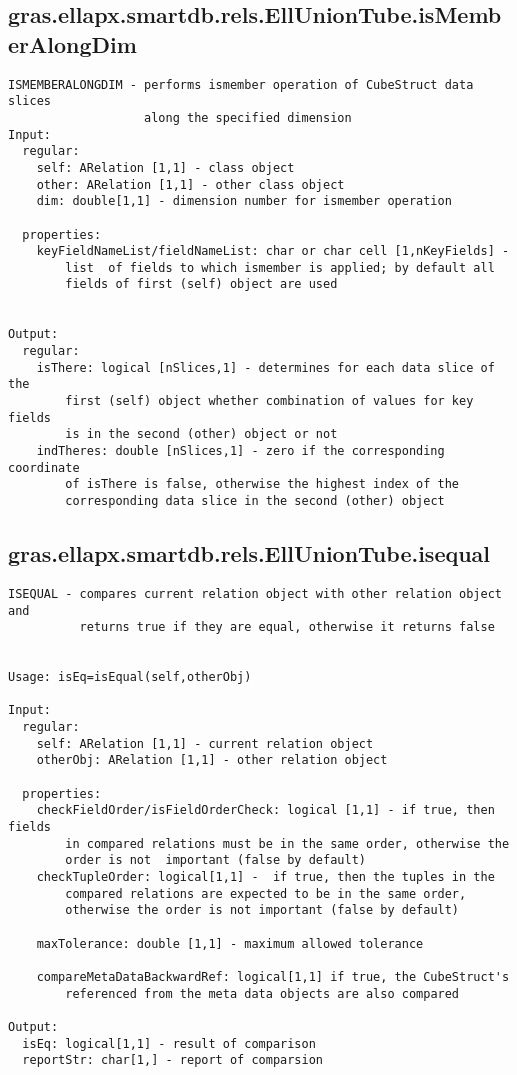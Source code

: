 \subsection{\texorpdfstring{gras.ellapx.smartdb.rels.EllUnionTube.isMemberAlongDim}{isMemberAlongDim}}\label{method:gras.ellapx.smartdb.rels.EllUnionTube.isMemberAlongDim}
\begin{verbatim}
ISMEMBERALONGDIM - performs ismember operation of CubeStruct data slices
                   along the specified dimension
Input:
  regular:
    self: ARelation [1,1] - class object
    other: ARelation [1,1] - other class object
    dim: double[1,1] - dimension number for ismember operation

  properties:
    keyFieldNameList/fieldNameList: char or char cell [1,nKeyFields] -
        list  of fields to which ismember is applied; by default all
        fields of first (self) object are used


Output:
  regular:
    isThere: logical [nSlices,1] - determines for each data slice of the
        first (self) object whether combination of values for key fields
        is in the second (other) object or not
    indTheres: double [nSlices,1] - zero if the corresponding coordinate
        of isThere is false, otherwise the highest index of the
        corresponding data slice in the second (other) object
\end{verbatim}
\subsection{\texorpdfstring{gras.ellapx.smartdb.rels.EllUnionTube.isequal}{isequal}}\label{method:gras.ellapx.smartdb.rels.EllUnionTube.isequal}
\begin{verbatim}
ISEQUAL - compares current relation object with other relation object and
          returns true if they are equal, otherwise it returns false


Usage: isEq=isEqual(self,otherObj)

Input:
  regular:
    self: ARelation [1,1] - current relation object
    otherObj: ARelation [1,1] - other relation object

  properties:
    checkFieldOrder/isFieldOrderCheck: logical [1,1] - if true, then fields
        in compared relations must be in the same order, otherwise the
        order is not  important (false by default)
    checkTupleOrder: logical[1,1] -  if true, then the tuples in the
        compared relations are expected to be in the same order,
        otherwise the order is not important (false by default)

    maxTolerance: double [1,1] - maximum allowed tolerance

    compareMetaDataBackwardRef: logical[1,1] if true, the CubeStruct's
        referenced from the meta data objects are also compared

Output:
  isEq: logical[1,1] - result of comparison
  reportStr: char[1,] - report of comparsion
\end{verbatim}
